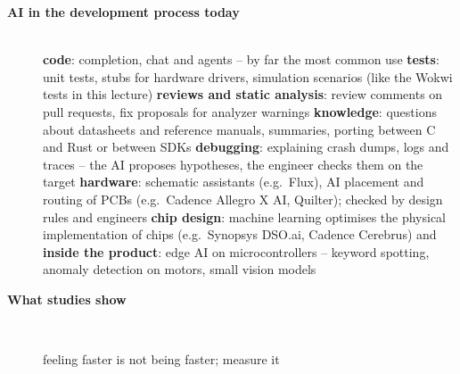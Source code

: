 \begin{description}
\item[{\rot\bf AI in the development process today}]~\\[-\lblskip]
\bi
	\ite \textbf{code}: completion, chat and agents -- by far the most common use \cite{so2025}
	\ite \textbf{tests}: unit tests, stubs for hardware drivers, simulation scenarios (like the Wokwi tests in this lecture)
	\ite \textbf{reviews and static analysis}: review comments on pull requests, fix proposals for analyzer warnings
	\ite \textbf{knowledge}: questions about datasheets and reference manuals, summaries, porting between C and Rust or between SDKs
	\ite \textbf{debugging}: explaining crash dumps, logs and traces -- the AI proposes hypotheses, the engineer checks them on the target
	\ite \textbf{hardware}: schematic assistants (e.g.\ Flux), AI placement and routing of PCBs (e.g.\ Cadence Allegro X AI, Quilter); checked by design rules and engineers
	\ite \textbf{chip design}: machine learning optimises the physical implementation of chips (e.g.\ Synopsys DSO.ai, Cadence Cerebrus)
	\ite and \textbf{inside the product}: edge AI on microcontrollers -- keyword spotting, anomaly detection on motors, small vision models
\ei
\os{\newpage}

\item[{\rot\bf What studies show}]~\\[-\lblskip]
\begin{center}
\end{center}
\bi
	\ite feeling faster is not being faster; measure it
\ei
\os{\newpage}


\end{description}
